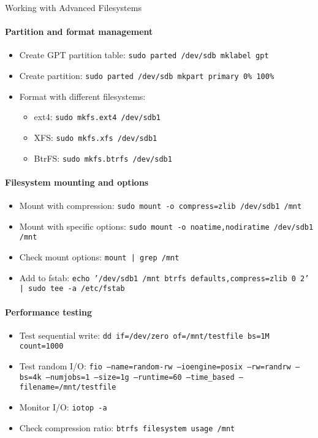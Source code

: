 \begin{KR}{Working with Advanced Filesystems}
    \paragraph{Partition and format management}
    \begin{itemize}
        \item Create GPT partition table: \texttt{sudo parted /dev/sdb mklabel gpt}
        \item Create partition: \texttt{sudo parted /dev/sdb mkpart primary 0\% 100\%}
        \item Format with different filesystems:
            \begin{itemize}
                \item ext4: \texttt{sudo mkfs.ext4 /dev/sdb1}
                \item XFS: \texttt{sudo mkfs.xfs /dev/sdb1}
                \item BtrFS: \texttt{sudo mkfs.btrfs /dev/sdb1}
            \end{itemize}
    \end{itemize}
    
    \paragraph{Filesystem mounting and options}
    \begin{itemize}
        \item Mount with compression: \texttt{sudo mount -o compress=zlib /dev/sdb1 /mnt}
        \item Mount with specific options: \texttt{sudo mount -o noatime,nodiratime /dev/sdb1 /mnt}
        \item Check mount options: \texttt{mount | grep /mnt}
        \item Add to fstab: \texttt{echo '/dev/sdb1 /mnt btrfs defaults,compress=zlib 0 2' | sudo tee -a /etc/fstab}
    \end{itemize}
    
    \paragraph{Performance testing}
    \begin{itemize}
        \item Test sequential write: \texttt{dd if=/dev/zero of=/mnt/testfile bs=1M count=1000}
        \item Test random I/O: \texttt{fio --name=random-rw --ioengine=posix --rw=randrw --bs=4k --numjobs=1 --size=1g --runtime=60 --time\_based --filename=/mnt/testfile}
        \item Monitor I/O: \texttt{iotop -a}
        \item Check compression ratio: \texttt{btrfs filesystem usage /mnt}
    \end{itemize}
    

\end{KR}
